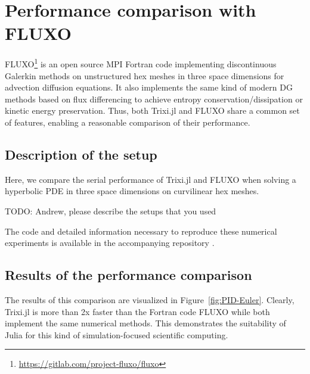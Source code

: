 \documentclass{juliacon}
\newcommand{\trixi}{Trixi.jl\xspace}
\newcommand{\todo}[1]{{\color{red}#1}}
\begin{document}
\section{Performance comparison with FLUXO}
\label{sec:performance-comparison}

FLUXO\footnote{\url{https://gitlab.com/project-fluxo/fluxo}} is an open source
MPI Fortran code implementing discontinuous Galerkin methods on unstructured hex
meshes in three space dimensions for advection diffusion equations. It also
implements the same kind of modern DG methods based on flux differencing
to achieve entropy conservation/dissipation or kinetic energy preservation.
Thus, both \trixi and FLUXO share a common set of features, enabling a reasonable
comparison of their performance.

\subsection{Description of the setup}

Here, we compare the serial performance of \trixi and FLUXO when solving a
hyperbolic PDE in three space dimensions on curvilinear hex meshes.

\todo{TODO: Andrew, please describe the setups that you used} %

The code and detailed information necessary to reproduce these numerical
experiments is available in the accompanying repository \cite{ranocha2021adaptiveRepro}.

\subsection{Results of the performance comparison}

The results of this comparison are visualized in Figure~\ref{fig:PID-Euler}.
Clearly, \trixi is more than 2x faster than the Fortran code FLUXO
while both implement the same numerical methods. This demonstrates the
suitability of Julia for this kind of simulation-focused scientific computing.
\end{document}
